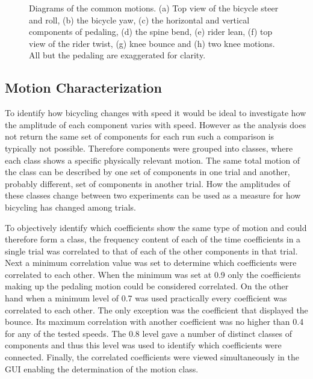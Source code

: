 \begin{figure}[]
    \begin{center}
        \qquad
        \qquad
        \qquad
        
        \qquad
        \qquad
        \qquad
    \end{center}
    \caption{Diagrams of the common motions. (a) Top view of the bicycle steer and roll, (b) the bicycle yaw, (c) the horizontal and vertical components of pedaling, (d) the spine bend, (e) rider lean, (f) top view of the rider twist, (g) knee bounce and (h) two knee motions. All but the pedaling are exaggerated for clarity.}
    \label{fig:motions}
\end{figure}

\subsection{Motion Characterization}
\label{sec:motionChar}
To identify how bicycling changes with speed it would be ideal to investigate how the amplitude of each component varies with speed. However as the analysis does not return the same set of components for each run such a comparison is typically not possible. Therefore components were grouped into classes, where each class shows a specific physically relevant motion. The same total motion of the class can be described by one set of components in one trial and another, probably different, set of components in another trial. How the amplitudes of these classes change between two experiments can be used as a measure for how bicycling has changed among trials.

To objectively identify which coefficients show the same type of motion and could therefore form a class, the frequency content of each of the time coefficients in a single trial was correlated to that of each of the other components in that trial. Next a minimum correlation value was set to determine which coefficients were correlated to each other. When the minimum was set at 0.9 only the coefficients making up the pedaling motion could be considered correlated. On the other hand when a minimum level of 0.7 was used practically every coefficient was correlated to each other. The only exception was the coefficient that displayed the bounce. Its maximum correlation with another coefficient was no higher than 0.4 for any of the tested speeds. The 0.8 level gave a number of distinct classes of components and thus this level was used to identify which coefficients were connected. Finally, the correlated coefficients were viewed simultaneously in the GUI enabling the determination of the motion class.

